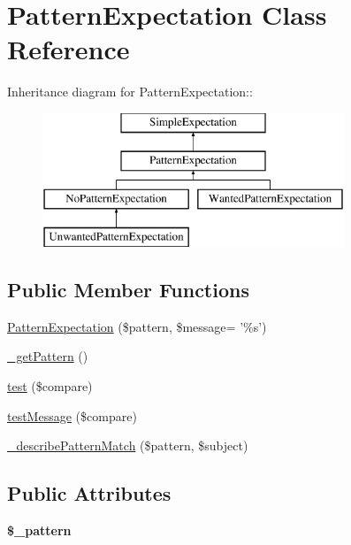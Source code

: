 \hypertarget{class_pattern_expectation}{
\section{PatternExpectation Class Reference}
\label{class_pattern_expectation}
}
Inheritance diagram for PatternExpectation::\begin{figure}[H]
\begin{center}
\leavevmode
\includegraphics[height=4cm]{class_pattern_expectation}
\end{center}
\end{figure}
\subsection*{Public Member Functions}
\begin{DoxyCompactItemize}
\item 
\hyperlink{class_pattern_expectation_a870ee69338895ba6f682be2f9889427a}{PatternExpectation} (\$pattern, \$message= '\%s')
\item 
\hyperlink{class_pattern_expectation_a6f9695a6350b86f418a42e0252f0e59e}{\_\-getPattern} ()
\item 
\hyperlink{class_pattern_expectation_a672fecfc691c4c115d4f4d37c365dae5}{test} (\$compare)
\item 
\hyperlink{class_pattern_expectation_a7adc09e88f1abac0401d807e7f4763c8}{testMessage} (\$compare)
\item 
\hyperlink{class_pattern_expectation_a9a6c6de1a8d1fccb816177426d5f5bda}{\_\-describePatternMatch} (\$pattern, \$subject)
\end{DoxyCompactItemize}
\subsection*{Public Attributes}
\begin{DoxyCompactItemize}
\item 
\hypertarget{class_pattern_expectation_a3c439fdabfebdd16b787f164724446e5}{
{\bfseries \$\_\-pattern}}
\label{class_pattern_expectation_a3c439fdabfebdd16b787f164724446e5}

\end{DoxyCompactItemize}


